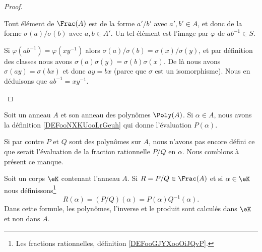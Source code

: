 \begin{proof}
\begin{subproof}
		\spitem[Surjectif]

		Tout élément de \( \Frac(A)\) est de la forme \( a'/b'\) avec \( a',b'\in A\), et donc de la forme \( \sigma(a)/\sigma(b)\) avec \( a,b\in A'\). Un tel élément est l'image par \( \varphi\) de \( ab^{-1}\in S\).

		\spitem[Injectif]

		Si \( \varphi(ab^{-1})=\varphi(xy^{-1})\) alors \( \sigma(a)/\sigma(b)=\sigma(x)/\sigma(y)\), et par définition des classes nous avons \( \sigma(a)\sigma(y)=\sigma(b)\sigma(x)\). De là nous avons \( \sigma(ay)=\sigma(bx)\) et donc \( ay=bx\) (parce que \( \sigma\) est un isomorphisme). Nous en déduisons que \( ab^{-1}=xy^{-1}\).
	\end{subproof}
\end{proof}

\begin{normaltext}
	Soit un anneau \( A\) et son anneau des polynômes \( \Poly(A)\). Si \( \alpha\in A\), nous avons la définition \ref{DEFooNXKUooLrGeuh} qui donne l'évaluation \( P(\alpha)\).

	Si par contre \( P\) et \( Q\) sont des polynômes sur \( A\), nous n'avons pas encore défini ce que serait l'évaluation de la fraction rationnelle \( P/Q\) en \( \alpha\). Nous comblons à présent ce manque.
\end{normaltext}

\begin{definition}       \label{DEFooLBIWooCPCaSY}
	Soit un corps \( \eK\) contenant l'anneau \( A\). Si \( R=P/Q\in \Frac(A)\) et si \( \alpha\in \eK\) nous définissons\footnote{Les fractions rationnelles, définition \ref{DEFooGJYXooOiJQvP}.}
	\begin{equation}
		R(\alpha)=(P/Q)(\alpha)=P(\alpha)Q^{-1}(\alpha).
	\end{equation}
	Dans cette formule, les polynômes, l'inverse et le produit sont calculés dans \( \eK\) et non dans \( A\).
\end{definition}

